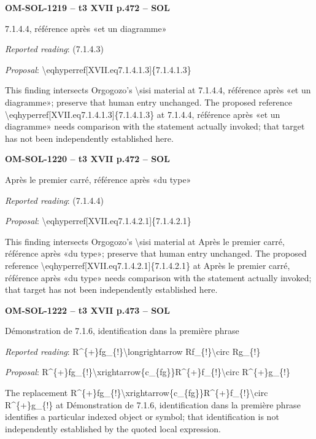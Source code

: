 \par\noindent\textbf{OM-SOL-1219 -- t3 XVII p.472 -- SOL}\par
7.1.4.4, référence après «et un diagramme»\par
\emph{Reported reading}: (7.1.4.3)\par
\emph{Proposal}: \textbackslash{}eqhyperref[XVII.eq7.1.4.1.3]\{7.1.4.1.3\}\par
This finding intersects Orgogozo's \textbackslash{}sisi material at 7.1.4.4, référence après «et un diagramme»; preserve that human entry unchanged. The proposed reference \textbackslash{}eqhyperref[XVII.eq7.1.4.1.3]\{7.1.4.1.3\} at 7.1.4.4, référence après «et un diagramme» needs comparison with the statement actually invoked; that target has not been independently established here.\par
\par\noindent\textbf{OM-SOL-1220 -- t3 XVII p.472 -- SOL}\par
Après le premier carré, référence après «du type»\par
\emph{Reported reading}: (7.1.4.4)\par
\emph{Proposal}: \textbackslash{}eqhyperref[XVII.eq7.1.4.2.1]\{7.1.4.2.1\}\par
This finding intersects Orgogozo's \textbackslash{}sisi material at Après le premier carré, référence après «du type»; preserve that human entry unchanged. The proposed reference \textbackslash{}eqhyperref[XVII.eq7.1.4.2.1]\{7.1.4.2.1\} at Après le premier carré, référence après «du type» needs comparison with the statement actually invoked; that target has not been independently established here.\par
\par\noindent\textbf{OM-SOL-1222 -- t3 XVII p.473 -- SOL}\par
Démonstration de 7.1.6, identification dans la première phrase\par
\emph{Reported reading}: R\textasciicircum{}\{+\}fg\_\{!\}\textbackslash{}longrightarrow Rf\_\{!\}\textbackslash{}circ Rg\_\{!\}\par
\emph{Proposal}: R\textasciicircum{}\{+\}fg\_\{!\}\textbackslash{}xrightarrow\{c\_\{fg\}\}R\textasciicircum{}\{+\}f\_\{!\}\textbackslash{}circ R\textasciicircum{}\{+\}g\_\{!\}\par
The replacement R\textasciicircum{}\{+\}fg\_\{!\}\textbackslash{}xrightarrow\{c\_\{fg\}\}R\textasciicircum{}\{+\}f\_\{!\}\textbackslash{}circ R\textasciicircum{}\{+\}g\_\{!\} at Démonstration de 7.1.6, identification dans la première phrase identifies a particular indexed object or symbol; that identification is not independently established by the quoted local expression.\par

